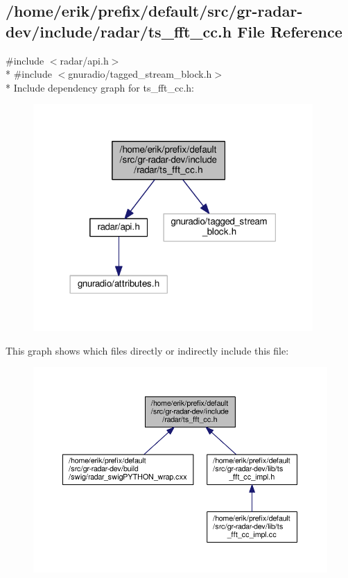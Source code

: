 \subsection{/home/erik/prefix/default/src/gr-\/radar-\/dev/include/radar/ts\+\_\+fft\+\_\+cc.h File Reference}
\label{ts__fft__cc_8h}
{\ttfamily \#include $<$radar/api.\+h$>$}\\*
{\ttfamily \#include $<$gnuradio/tagged\+\_\+stream\+\_\+block.\+h$>$}\\*
Include dependency graph for ts\+\_\+fft\+\_\+cc.\+h\+:
\nopagebreak
\begin{figure}[H]
\begin{center}
\leavevmode
\includegraphics[width=302pt]{de/d78/ts__fft__cc_8h__incl}
\end{center}
\end{figure}
This graph shows which files directly or indirectly include this file\+:
\nopagebreak
\begin{figure}[H]
\begin{center}
\leavevmode
\includegraphics[width=350pt]{dc/db1/ts__fft__cc_8h__dep__incl}
\end{center}
\end{figure}
